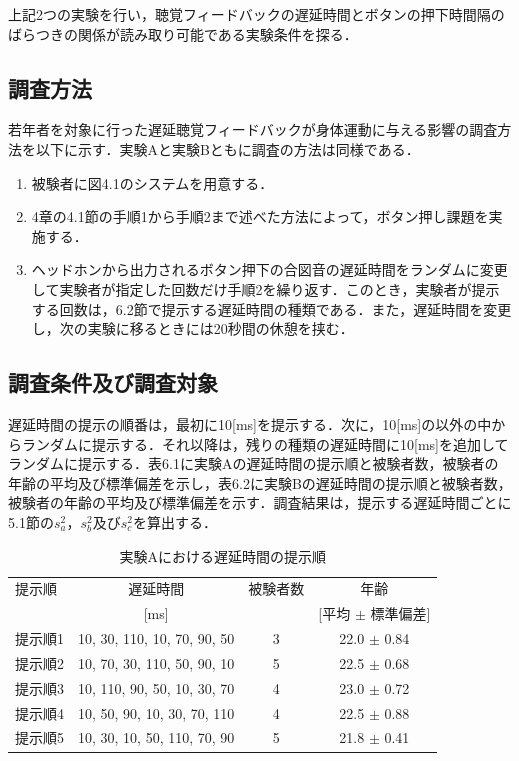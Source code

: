 上記2つの実験を行い，聴覚フィードバックの遅延時間とボタンの押下時間隔のばらつきの関係が読み取り可能である実験条件を探る．
\subsection{調査方法}
若年者を対象に行った遅延聴覚フィードバックが身体運動に与える影響の調査方法を以下に示す．実験Aと実験Bともに調査の方法は同様である．
\begin{enumerate}[leftmargin=*]
  \item 被験者に図4.1のシステムを用意する．
  \item 4章の4.1節の手順1から手順2まで述べた方法によって，ボタン押し課題を実施する．
  \item ヘッドホンから出力されるボタン押下の合図音の遅延時間をランダムに変更して実験者が指定した回数だけ手順2を繰り返す．このとき，実験者が提示する回数は，6.2節で提示する遅延時間の種類である．また，遅延時間を変更し，次の実験に移るときには20秒間の休憩を挟む．
\end{enumerate}

\subsection{調査条件及び調査対象}
遅延時間の提示の順番は，最初に10[ms]を提示する．次に，10[ms]の以外の中からランダムに提示する．それ以降は，残りの種類の遅延時間に10[ms]を追加してランダムに提示する．表6.1に実験Aの遅延時間の提示順と被験者数，被験者の年齢の平均及び標準偏差を示し，表6.2に実験Bの遅延時間の提示順と被験者数，被験者の年齢の平均及び標準偏差を示す．調査結果は，提示する遅延時間ごとに5.1節の$s^2_{a}$，$s^2_{b}$及び$s^2_{c}$を算出する．
\begin{table}[btp]
  \caption{実験Aにおける遅延時間の提示順}
  \label{table:A_delay_time}
  \centering
  \begin{tabular}{lccc}
    \hline
    提示順 & 遅延時間 & 被験者数 & 年齢\\
    　& [ms] & & [平均 $\pm$ 標準偏差]\\
    \hline \hline
    提示順1  & 10, 30, 110, 10, 70, 90, 50  & 3 & 22.0 $\pm$ 0.84\\
    提示順2  & 10, 70, 30, 110, 50, 90, 10  & 5 & 22.5 $\pm$ 0.68\\
    提示順3  & 10, 110, 90, 50, 10, 30, 70  & 4 & 23.0 $\pm$ 0.72\\
    提示順4  & 10, 50, 90, 10, 30, 70, 110  & 4 & 22.5 $\pm$ 0.88\\
    提示順5  & 10, 30, 10, 50, 110, 70, 90  & 5 & 21.8 $\pm$ 0.41
\\
    \hline
  \end{tabular}
\end{table}

